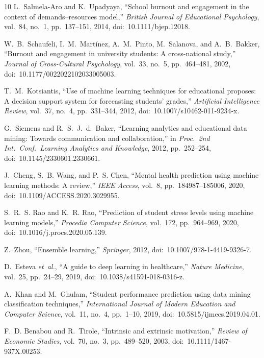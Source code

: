 \documentclass[conference]{IEEEtran}
\begin{document}
\begin{thebibliography}{10}
L.~Salmela-Aro and K.~Upadyaya, ``School burnout and engagement in the context of demands–resources model,'' \emph{British Journal of Educational Psychology}, vol.~84, no.~1, pp.~137--151, 2014, doi:~10.1111/bjep.12018.

W.~B.~Schaufeli, I.~M.~Martínez, A.~M.~Pinto, M.~Salanova, and A.~B.~Bakker, ``Burnout and engagement in university students: A cross-national study,'' \emph{Journal of Cross-Cultural Psychology}, vol.~33, no.~5, pp.~464--481, 2002, doi:~10.1177/0022022102033005003.

T.~M.~Kotsiantis, ``Use of machine learning techniques for educational proposes: A decision support system for forecasting students’ grades,'' \emph{Artificial Intelligence Review}, vol.~37, no.~4, pp.~331--344, 2012, doi:~10.1007/s10462-011-9234-x.

G.~Siemens and R.~S.~J.~d.~Baker, ``Learning analytics and educational data mining: Towards communication and collaboration,'' in \emph{Proc.\ 2nd Int.\ Conf.\ Learning Analytics and Knowledge}, 2012, pp.~252--254, doi:~10.1145/2330601.2330661.

J.~Cheng, S.~B. Wang, and P.~S. Chen, ``Mental health prediction using machine learning methods: A review,'' \emph{IEEE Access}, vol.~8, pp.~184987--185006, 2020, doi:~10.1109/ACCESS.2020.3029955.

S.~R.~S. Rao and K.~R. Rao, ``Prediction of student stress levels using machine learning models,'' \emph{Procedia Computer Science}, vol.~172, pp.~964--969, 2020, doi:~10.1016/j.procs.2020.05.139.

Z.~Zhou, ``Ensemble learning,'' \emph{Springer}, 2012, doi:~10.1007/978-1-4419-9326-7.

D.~Esteva \emph{et~al.}, ``A guide to deep learning in healthcare,'' \emph{Nature Medicine}, vol.~25, pp.~24--29, 2019, doi:~10.1038/s41591-018-0316-z.

A.~Khan and M.~Ghulam, ``Student performance prediction using data mining classification techniques,'' \emph{International Journal of Modern Education and Computer Science}, vol.~11, no.~4, pp.~1--10, 2019, doi:~10.5815/ijmecs.2019.04.01.

F.~D. Benabou and R.~Tirole, ``Intrinsic and extrinsic motivation,'' \emph{Review of Economic Studies}, vol.~70, no.~3, pp.~489--520, 2003, doi:~10.1111/1467-937X.00253.
\end{thebibliography}
\end{document}
